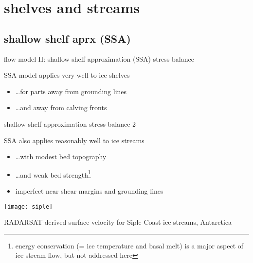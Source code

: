
\section{shelves and streams}


\subsection{shallow shelf aprx (SSA)}

\begin{frame}{flow model II: shallow shelf approximation (SSA) stress balance}
  
SSA model applies very well to \alert{ice shelves}
\begin{itemize}
\item \dots for parts away from grounding lines
\item \dots and away from calving fronts
\end{itemize}
\end{frame}


\begin{frame}{shallow shelf approximation stress balance 2}

SSA also applies reasonably well to \alert{ice streams}
\begin{itemize}
\item \dots with modest bed topography
\item \dots and weak bed strength\footnote{energy conservation (= ice temperature and basal melt) is a major aspect of ice stream flow, but not addressed here}
\item imperfect near shear margins and grounding lines
\end{itemize}

\begin{center}
  \texttt{[image: siple]}

\tiny RADARSAT-derived surface velocity for Siple Coast ice streams, Antarctica 
\end{center}
\end{frame}



